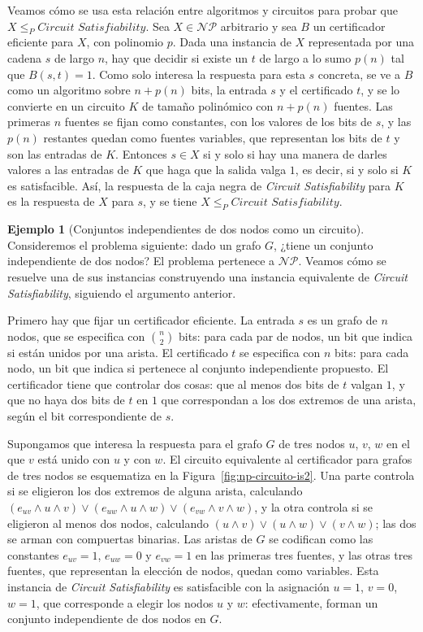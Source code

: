 \documentclass[12pt, spanish, oneside, openany]{book}
\newcommand{\NP}{\mathcal{NP}}
\newcommand{\redp}{\le_{P}}
\newcommand{\prob}[1]{\textit{#1}}
\newcommand{\CSAT}{\prob{Circuit Satisfiability}\xspace}
\theoremstyle{uprightplain}
\theoremstyle{definition}
\newtheorem{ejemplo}[teorema]{Ejemplo}
\theoremstyle{remark}
\theoremstyle{definition}
\begin{document}
Veamos cómo se usa esta relación entre algoritmos y circuitos para probar que $X\redp\CSAT$. Sea $X\in\NP$ arbitrario y sea $B$ un certificador eficiente para $X$, con polinomio $p$. Dada una instancia de $X$ representada por una cadena $s$ de largo $n$, hay que decidir si existe un $t$ de largo a lo sumo $p(n)$ tal que $B(s,t)=1$. Como solo interesa la respuesta para esta $s$ concreta, se ve a $B$ como un algoritmo sobre $n+p(n)$ bits, la entrada $s$ y el certificado $t$, y se lo convierte en un circuito $K$ de tamaño polinómico con $n+p(n)$ fuentes. Las primeras $n$ fuentes se fijan como constantes, con los valores de los bits de $s$, y las $p(n)$ restantes quedan como fuentes variables, que representan los bits de $t$ y son las entradas de $K$. Entonces $s\in X$ si y solo si hay una manera de darles valores a las entradas de $K$ que haga que la salida valga $1$, es decir, si y solo si $K$ es satisfacible. Así, la respuesta de la caja negra de \CSAT para $K$ es la respuesta de $X$ para $s$, y se tiene $X\redp\CSAT$.

\begin{ejemplo}[Conjuntos independientes de dos nodos como un circuito]
\label{ej:np-circuito-is2}
Consideremos el problema siguiente: dado un grafo $G$, ¿tiene un conjunto independiente de dos nodos? El problema pertenece a $\NP$. Veamos cómo se resuelve una de sus instancias construyendo una instancia equivalente de \CSAT, siguiendo el argumento anterior.

Primero hay que fijar un certificador eficiente. La entrada $s$ es un grafo de $n$ nodos, que se especifica con $\binom{n}{2}$ bits: para cada par de nodos, un bit que indica si están unidos por una arista. El certificado $t$ se especifica con $n$ bits: para cada nodo, un bit que indica si pertenece al conjunto independiente propuesto. El certificador tiene que controlar dos cosas: que al menos dos bits de $t$ valgan $1$, y que no haya dos bits de $t$ en $1$ que correspondan a los dos extremos de una arista, según el bit correspondiente de $s$.

Supongamos que interesa la respuesta para el grafo $G$ de tres nodos $u$, $v$, $w$ en el que $v$ está unido con $u$ y con $w$. El circuito equivalente al certificador para grafos de tres nodos se esquematiza en la Figura~\ref{fig:np-circuito-is2}. Una parte controla si se eligieron los dos extremos de alguna arista, calculando $(e_{uv}\wedge u\wedge v)\vee(e_{uw}\wedge u\wedge w)\vee(e_{vw}\wedge v\wedge w)$, y la otra controla si se eligieron al menos dos nodos, calculando $(u\wedge v)\vee(u\wedge w)\vee(v\wedge w)$; las dos se arman con compuertas binarias. Las aristas de $G$ se codifican como las constantes $e_{uv}=1$, $e_{uw}=0$ y $e_{vw}=1$ en las primeras tres fuentes, y las otras tres fuentes, que representan la elección de nodos, quedan como variables. Esta instancia de \CSAT es satisfacible con la asignación $u=1$, $v=0$, $w=1$, que corresponde a elegir los nodos $u$ y $w$: efectivamente, forman un conjunto independiente de dos nodos en $G$.
\end{ejemplo}
\end{document}
